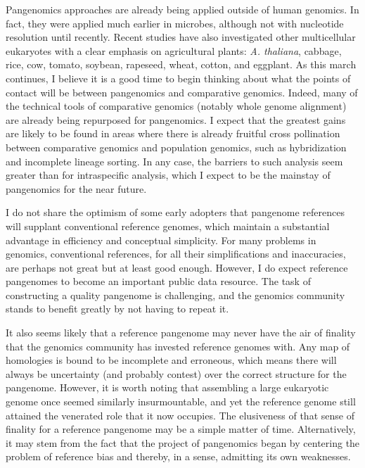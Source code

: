 \documentclass[11pt]{ucthesis}
\begin{document}
Pangenomics approaches are already being applied outside of human genomics. In fact, they were applied much earlier in microbes\cite{medini2005microbial}, although not with nucleotide resolution until recently\cite{colquhoun2020nucleotide}. Recent studies have also investigated other multicellular eukaryotes with a clear emphasis on agricultural plants: \textit{A. thaliana}\cite{alonso20161}, cabbage\cite{golicz2016pangenome}, rice\cite{sun2017rpan,zhou2020platinum,qin2021pan}, cow\cite{crysnanto2019accurate,crysnanto2020bovine,crysnanto2021novel}, tomato\cite{gao2019tomato}, soybean\cite{liu2020pan}, rapeseed\cite{song2020eight}, wheat\cite{walkowiak2020multiple}, cotton\cite{li2021cotton}, and eggplant\cite{barchi2021improved}. As this march continues, I believe it is a good time to begin thinking about what the points of contact will be between pangenomics and comparative genomics. Indeed, many of the technical tools of comparative genomics (notably whole genome alignment) are already being repurposed for pangenomics\cite{armstrong2020progressive}. I expect that the greatest gains are likely to be found in areas where there is already fruitful cross pollination between comparative genomics and population genomics, such as hybridization and incomplete lineage sorting. In any case, the barriers to such analysis seem greater than for intraspecific analysis, which I expect to be the mainstay of pangenomics for the near future.

I do not share the optimism of some early adopters that pangenome references will supplant conventional reference genomes, which maintain a substantial advantage in efficiency and conceptual simplicity. For many problems in genomics, conventional references, for all their simplifications and inaccuracies, are perhaps not great but at least good enough. However, I do expect reference pangenomes to become an important public data resource. The task of constructing a quality pangenome is challenging, and the genomics community stands to benefit greatly by not having to repeat it. 

It also seems likely that a reference pangenome may never have the air of finality that the genomics community has invested reference genomes with. Any map of homologies is bound to be incomplete and erroneous, which means there will always be uncertainty (and probably contest) over the correct structure for the pangenome. However, it is worth noting that assembling a large eukaryotic genome once seemed similarly insurmountable, and yet the reference genome still attained the venerated role that it now occupies. The elusiveness of that sense of finality for a reference pangenome may be a simple matter of time. Alternatively, it may stem from the fact that the project of pangenomics began by centering the problem of reference bias and thereby, in a sense, admitting its own weaknesses. 
\end{document}
